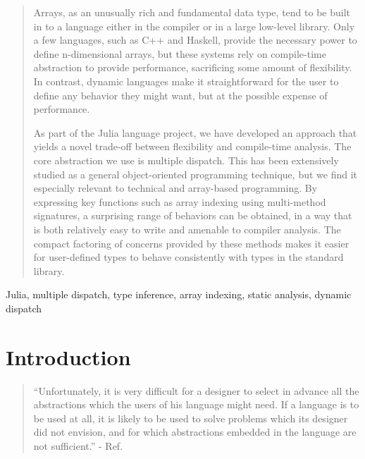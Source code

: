 \documentclass[preprint]{sigplanconf}
\begin{document}
\begin{abstract}

Arrays, as an unusually rich and fundamental data type, tend to be built in to a language
either in the compiler or in a large low-level library. 
Only a few languages, such as C++ and Haskell, provide the necessary power to define
n-dimensional arrays, but these systems rely on compile-time abstraction to provide
performance, sacrificing some amount of flexibility.
In contrast, dynamic languages make it straightforward for the user to define any
behavior they might want, but at the possible expense of performance.

As part of the Julia language project, we have developed an approach that yields
a novel trade-off between flexibility and compile-time analysis. The core
abstraction we use is multiple dispatch. This has been extensively studied
as a general object-oriented programming technique, but we find it
especially relevant to technical and array-based programming. By expressing
key functions such as array indexing using multi-method
signatures, a surprising range of behaviors can be obtained, in a way that is
both relatively easy to write and amenable to compiler analysis.
The compact factoring of concerns provided by these methods makes it easier
for user-defined types to behave consistently with types in the standard
library.




\end{abstract}


\keywords
Julia, multiple dispatch, type inference, array indexing, static analysis,
dynamic dispatch

\section{Introduction}

\begin{quotation}
``Unfortunately, it is very difficult for a designer to select in advance all
the abstractions which the users of his language might need. If a language is
to be used at all, it is likely to be used to solve problems which its
designer did not envision, and for which abstractions embedded in the language
are not sufficient.'' - Ref. \cite{Liskov:1974pb}
\end{quotation}
\end{document}
